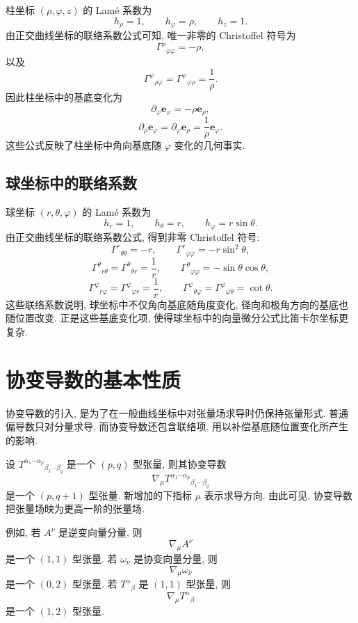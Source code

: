 柱坐标 $(\rho,\varphi,z)$ 的 Lamé 系数为
\[
h_{\rho}=1,
\qquad
h_{\varphi}=\rho,
\qquad
h_{z}=1.
\]
由正交曲线坐标的联络系数公式可知, 唯一非零的 Christoffel 符号为
\[
\Gamma^{\rho}{}_{\varphi\varphi}
=
-\rho,
\]
以及
\[
\Gamma^{\varphi}{}_{\rho\varphi}
=
\Gamma^{\varphi}{}_{\varphi\rho}
=
\frac{1}{\rho}.
\]
因此柱坐标中的基底变化为
\[
\partial_{\varphi}\bm{e}_{\varphi}
=
-\rho\bm{e}_{\rho},
\]
\[
\partial_{\rho}\bm{e}_{\varphi}
=
\partial_{\varphi}\bm{e}_{\rho}
=
\frac{1}{\rho}\bm{e}_{\varphi}.
\]
这些公式反映了柱坐标中角向基底随 $\varphi$ 变化的几何事实. 

\subsection{球坐标中的联络系数}

球坐标 $(r,\theta,\varphi)$ 的 Lamé 系数为
\[
h_{r}=1,
\qquad
h_{\theta}=r,
\qquad
h_{\varphi}=r\sin\theta.
\]
由正交曲线坐标的联络系数公式, 得到非零 Christoffel 符号: 
\[
\Gamma^{r}{}_{\theta\theta}
=
-r,
\qquad
\Gamma^{r}{}_{\varphi\varphi}
=
-r\sin^{2}\theta,
\]
\[
\Gamma^{\theta}{}_{r\theta}
=
\Gamma^{\theta}{}_{\theta r}
=
\frac{1}{r},
\qquad
\Gamma^{\theta}{}_{\varphi\varphi}
=
-\sin\theta\cos\theta,
\]
\[
\Gamma^{\varphi}{}_{r\varphi}
=
\Gamma^{\varphi}{}_{\varphi r}
=
\frac{1}{r},
\qquad
\Gamma^{\varphi}{}_{\theta\varphi}
=
\Gamma^{\varphi}{}_{\varphi\theta}
=
\cot\theta.
\]
这些联络系数说明, 球坐标中不仅角向基底随角度变化, 径向和极角方向的基底也随位置改变. 正是这些基底变化项, 使得球坐标中的向量微分公式比笛卡尔坐标更复杂. 

\section{协变导数的基本性质}

协变导数的引入, 是为了在一般曲线坐标中对张量场求导时仍保持张量形式. 普通偏导数只对分量求导, 而协变导数还包含联络项, 用以补偿基底随位置变化所产生的影响. 

设 $T^{\alpha_{1}\cdots\alpha_{p}}{}_{\beta_{1}\cdots\beta_{q}}$ 是一个 $(p,q)$ 型张量, 则其协变导数
\[
\nabla_{\mu}T^{\alpha_{1}\cdots\alpha_{p}}{}_{\beta_{1}\cdots\beta_{q}}
\]
是一个 $(p,q+1)$ 型张量. 新增加的下指标 $\mu$ 表示求导方向. 由此可见, 协变导数把张量场映为更高一阶的张量场. 

例如, 若 $A^{\nu}$ 是逆变向量分量, 则
\[
\nabla_{\mu}A^{\nu}
\]
是一个 $(1,1)$ 型张量. 若 $\omega_{\nu}$ 是协变向量分量, 则
\[
\nabla_{\mu}\omega_{\nu}
\]
是一个 $(0,2)$ 型张量. 若 $T^{\alpha}{}_{\beta}$ 是 $(1,1)$ 型张量, 则
\[
\nabla_{\mu}T^{\alpha}{}_{\beta}
\]
是一个 $(1,2)$ 型张量. 

